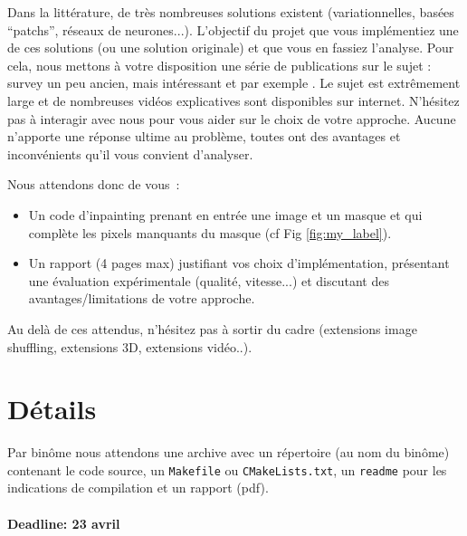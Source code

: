 \documentclass{article}
\begin{document}
Dans la littérature, de très nombreuses solutions existent
(variationnelles, basées ``patchs'', réseaux de
neurones...). L'objectif du projet que vous implémentiez une de ces
solutions (ou une solution originale) et que vous en fassiez
l'analyse. Pour cela, nous mettons à votre disposition une série de
publications sur le sujet : survey un peu ancien, mais intéressant
\cite{bertalmio2014inpainting} et par exemple
\cite{masnou1998level,criminisi2003object,barnes2009patchmatch,2017arXiv171203111L}.
Le sujet est extrêmement large et de nombreuses vidéos explicatives
sont disponibles sur internet. N'hésitez pas à interagir avec nous
pour vous aider sur le choix de votre approche. Aucune n'apporte une
réponse ultime au problème, toutes ont des avantages et inconvénients
qu'il vous convient d'analyser.

Nous attendons donc de vous~:
\begin{itemize}
\item Un code d'inpainting prenant en entrée une image et un masque et
  qui complète les pixels manquants du masque (cf Fig
  \ref{fig:my_label}).
\item Un rapport (4 pages max) justifiant vos choix d'implémentation,
  présentant une évaluation expérimentale (qualité, vitesse...) et discutant des
  avantages/limitations de votre approche.
\end{itemize}


Au delà de ces attendus, n'hésitez pas à sortir
du cadre (extensions image shuffling, extensions 3D,
extensions vidéo..).

\section*{Détails}


Par binôme nous attendons une archive avec un répertoire (au nom du
binôme) contenant le code source, un \texttt{Makefile} ou
\texttt{CMakeLists.txt}, un \texttt{readme} pour les indications de
compilation et un rapport (pdf).
\\
\\
\noindent\textbf{Deadline: 23 avril}



\end{document}

